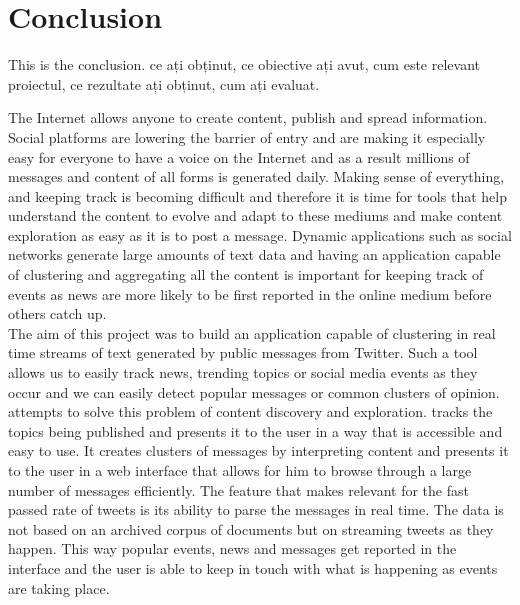 \chapter{Conclusion}
\label{chapter:conclusion}

This is the conclusion.  ce ați obținut, ce obiective ați avut, cum este relevant proiectul, ce rezultate ați obținut, cum ați evaluat.

The Internet allows anyone to create content, publish and spread information. Social platforms are lowering the barrier of entry and are making it especially easy for everyone to have a voice on the Internet and as a result millions of messages and content of all forms is generated daily. Making sense of everything, and keeping track is becoming difficult and therefore it is time for tools that help understand the content to evolve and adapt to these mediums and make content exploration as easy as it is to post a message.
\newline
Dynamic applications such as social networks generate large amounts of text data and having an application capable of clustering and aggregating all the content is important for keeping track of events as news are more likely to be first reported in the online medium before others catch up.
\newline\\
The aim of this project was to build an application capable of clustering in real time streams of text generated by public messages from Twitter. Such a tool allows us to easily track news, trending topics or social media events as they occur and we can easily detect popular messages or common clusters of opinion.
\newline
{\project}  attempts to solve this problem of content discovery and exploration. {\project}  tracks the topics being published and presents it to the user in a way that is accessible and easy to use. It creates clusters of messages by interpreting content and presents it to the user in a web interface that allows for him to browse through a large number of messages efficiently.
\newline
The feature that makes {\project}  relevant for the fast passed rate of tweets is its ability to parse the messages in real time. The data is not based on an archived corpus of documents but on streaming tweets as they happen. This way popular events, news and messages get reported in the interface and the user is able to keep in touch with what is happening as events are taking place.
\newline
